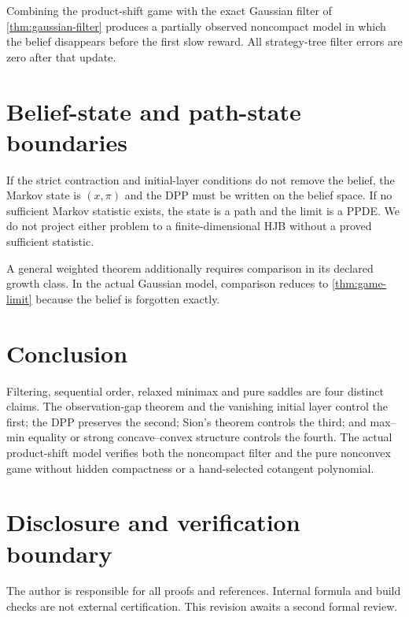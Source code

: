 \documentclass[11pt,reqno]{amsart}
\theoremstyle{definition}
\theoremstyle{remark}
\begin{document}
Combining the product-shift game with the exact Gaussian filter of
\cref{thm:gaussian-filter} produces a partially observed noncompact model in
which the belief disappears before the first slow reward.  All strategy-tree
filter errors are zero after that update.

\section{Belief-state and path-state boundaries}\label{sec:belief}

If the strict contraction and initial-layer conditions do not remove the
belief, the Markov state is $(x,\pi)$ and the DPP must be written on the belief
space.  If no sufficient Markov statistic exists, the state is a path and the
limit is a PPDE.  We do not project either problem to a finite-dimensional HJB
without a proved sufficient statistic.

A general weighted theorem additionally requires comparison in its declared
growth class.  In the actual Gaussian model, comparison reduces to
\cref{thm:game-limit} because the belief is forgotten exactly.

\section{Conclusion}

Filtering, sequential order, relaxed minimax and pure saddles are four distinct
claims.  The observation-gap theorem and the vanishing initial layer control
the first; the DPP preserves the second; Sion's theorem controls the third; and
max--min equality or strong concave--convex structure controls the fourth.  The
actual product-shift model verifies both the noncompact filter and the pure
nonconvex game without hidden compactness or a hand-selected cotangent
polynomial.

\section*{Disclosure and verification boundary}
The author is responsible for all proofs and references.  Internal formula and
build checks are not external certification.  This revision awaits a second
formal review.



\end{document}
